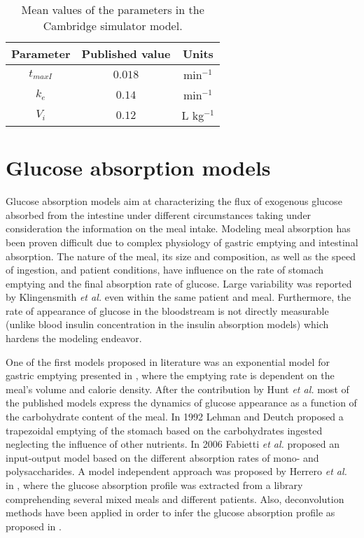 \begin{table}[hbtp]
	\centering
		\begin{tabular}{|c c c|}
		\hline 
		Parameter &	Published value & Units \\
		\hline
		$t_{maxI}$ & $0.018$ & min$^{-1}$ \\
		$k_{e}$ & $0.14$ & min$^{-1}$ \\
		$V_{i}$ & $0.12$ & L kg$^{-1}$ \\
		\hline		
		\end{tabular}
	\caption{Mean values of the parameters in the Cambridge simulator model.}
	\label{tab:Willinska_simulador}
\end{table}

\section{Glucose absorption models}	
\label{sec:GlucoseAbsorptionModels}

Glucose absorption models aim at characterizing the flux of exogenous glucose absorbed from the intestine under different circumstances taking under consideration the information on the meal intake. Modeling meal absorption has been proven difficult due to complex physiology of gastric emptying and intestinal absorption. The nature of the meal, its size and composition, as well as the speed of ingestion, and patient conditions, have influence on the rate of stomach emptying \cite{mitchell1989gastric} and the final absorption rate of glucose. Large variability was reported by Klingensmith \textit{et al.} \cite{klingensmith2010gastric} even within the same patient and meal. Furthermore, the rate of appearance of glucose in the bloodstream is not directly measurable (unlike blood insulin concentration in the insulin absorption models) which hardens the modeling endeavor.

One of the first models proposed in literature was an exponential model for gastric emptying presented in \cite{hunt1975volume}, where the emptying rate is dependent on the meal's volume and calorie density. After the contribution by Hunt \textit{et al.} most of the published models express the dynamics of glucose appearance as a function of the carbohydrate content of the meal. In 1992 Lehman and Deutch \cite{lehmann1992physiological} proposed a trapezoidal emptying of the stomach based on the carbohydrates ingested neglecting the influence of other nutrients. In 2006 Fabietti \textit{et al.} \cite{fabietti2006control} proposed an input-output model based on the different absorption rates of mono- and polysaccharides. A model independent approach was proposed by Herrero \textit{et al.} in \cite{bibliotecapau}, where the glucose absorption profile was extracted from a library comprehending several mixed meals and different patients. Also, deconvolution methods have been applied in order to infer the glucose absorption profile as proposed in \cite{herrero2012simple}.

